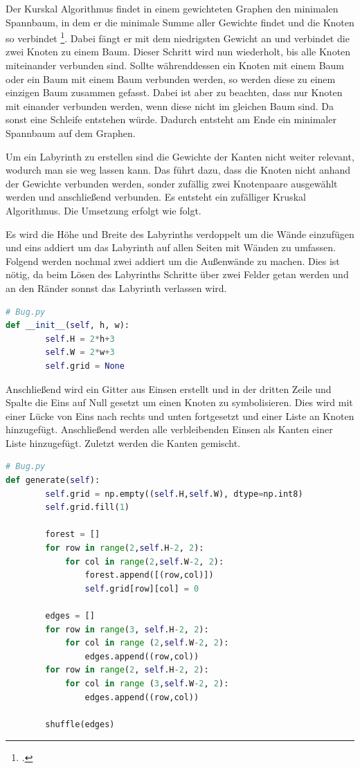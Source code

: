 \documentclass[12pt, a4paper, titlepage]{article}
\begin{document}
\bigskip

Der Kurskal Algorithmus findet in einem gewichteten Graphen den minimalen Spannbaum, in dem er die minimale Summe aller Gewichte findet und die Knoten so verbindet \footcite{maze}.
Dabei fängt er mit dem niedrigsten Gewicht an und verbindet die zwei Knoten zu einem Baum.
Dieser Schritt wird nun wiederholt, bis alle Knoten miteinander verbunden sind.
Sollte währenddessen ein Knoten mit einem Baum oder ein Baum mit einem Baum verbunden werden, so werden diese zu einem einzigen Baum zusammen gefasst.
Dabei ist aber zu beachten, dass nur Knoten mit einander verbunden werden, wenn diese nicht im gleichen Baum sind.
Da sonst eine Schleife entstehen würde.
Dadurch entsteht am Ende ein minimaler Spannbaum auf dem Graphen.
 

\bigskip

Um ein Labyrinth zu erstellen sind die Gewichte der Kanten nicht weiter relevant, wodurch man sie weg lassen kann.
Das führt dazu, dass die Knoten nicht anhand der Gewichte verbunden werden, sonder zufällig zwei Knotenpaare ausgewählt werden und anschließend verbunden.
Es entsteht ein zufälliger Kruskal Algorithmus.
Die Umsetzung erfolgt wie folgt.


Es wird die Höhe und Breite des Labyrinths verdoppelt um die Wände einzufügen und eins addiert um das Labyrinth auf allen Seiten mit Wänden zu umfassen.
Folgend werden nochmal zwei addiert um die Außenwände  zu machen. Dies ist nötig, da beim Lösen des Labyrinths Schritte über zwei Felder getan werden und an den Ränder sonnst das Labyrinth verlassen wird.
\begin{lstlisting}[language = Python]
# Bug.py
def __init__(self, h, w):
        self.H = 2*h+3
        self.W = 2*w+3
        self.grid = None
\end{lstlisting}

Anschließend wird ein Gitter aus Einsen erstellt und in der dritten Zeile und Spalte die Eins auf Null gesetzt um einen Knoten zu symbolisieren.
Dies wird mit einer Lücke von Eins nach rechts und unten fortgesetzt und einer Liste an Knoten hinzugefügt.
Anschließend werden alle verbleibenden Einsen als Kanten einer Liste hinzugefügt.
Zuletzt werden die Kanten gemischt.

\begin{lstlisting}[language = Python]
# Bug.py
def generate(self):
        self.grid = np.empty((self.H,self.W), dtype=np.int8)
        self.grid.fill(1)
        
        forest = []
        for row in range(2,self.H-2, 2):
            for col in range(2,self.W-2, 2):
                forest.append([(row,col)])
                self.grid[row][col] = 0
        
        edges = []
        for row in range(3, self.H-2, 2):
            for col in range (2,self.W-2, 2):
                edges.append((row,col))
        for row in range(2, self.H-2, 2):
            for col in range (3,self.W-2, 2):
                edges.append((row,col))
        
        shuffle(edges)
\end{lstlisting}
\end{document}
